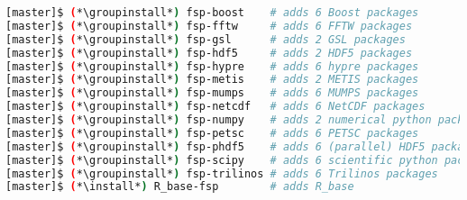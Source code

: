 \begin{lstlisting}[language=bash,keywords={},upquote=true,keepspaces]
[master]$ (*\groupinstall*) fsp-boost    # adds 6 Boost packages
[master]$ (*\groupinstall*) fsp-fftw     # adds 6 FFTW packages
[master]$ (*\groupinstall*) fsp-gsl      # adds 2 GSL packages
[master]$ (*\groupinstall*) fsp-hdf5     # adds 2 HDF5 packages
[master]$ (*\groupinstall*) fsp-hypre    # adds 6 hypre packages
[master]$ (*\groupinstall*) fsp-metis    # adds 2 METIS packages
[master]$ (*\groupinstall*) fsp-mumps    # adds 6 MUMPS packages
[master]$ (*\groupinstall*) fsp-netcdf   # adds 6 NetCDF packages
[master]$ (*\groupinstall*) fsp-numpy    # adds 2 numerical python packages
[master]$ (*\groupinstall*) fsp-petsc    # adds 6 PETSC packages
[master]$ (*\groupinstall*) fsp-phdf5    # adds 6 (parallel) HDF5 packages
[master]$ (*\groupinstall*) fsp-scipy    # adds 6 scientific python packages
[master]$ (*\groupinstall*) fsp-trilinos # adds 6 Trilinos packages
[master]$ (*\install*) R_base-fsp        # adds R_base 
\end{lstlisting}
